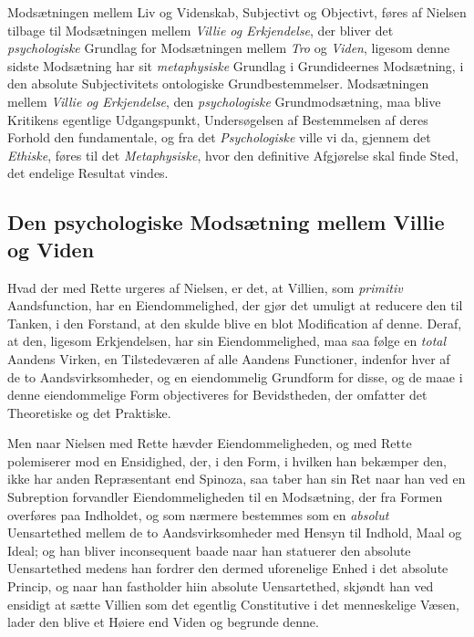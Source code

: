 \documentclass[12pt,a4paper]{book}
\newcommand{\opage}[1]{\marginnote{\footnotesize\textit{[#1]}}}
\begin{document}
Modsætningen mellem Liv og Videnskab, Subjectivt og Objectivt, føres af Nielsen tilbage til
Modsætningen mellem \emph{Villie og Erkjendelse}, der bliver det \emph{psychologiske} Grundlag for Modsætningen mellem \emph{Tro} og \emph{Viden}, ligesom denne sidste Modsætning har sit \emph{metaphysiske} Grundlag i Grundideernes Modsætning, i den absolute Subjectivitets ontologiske
Grundbestemmelser. Modsætningen mellem \emph{Villie og Erkjendelse}, den \emph{psychologiske} Grundmodsætning, maa blive Kritikens egentlige Udgangspunkt, Undersøgelsen af Bestemmelsen
af deres Forhold den fundamentale, og fra det \emph{Psychologiske} ville vi da, gjennem det \emph{Ethiske}, føres til det \emph{Metaphysiske}, hvor den definitive Afgjørelse skal finde Sted, det
endelige Resultat vindes.

\subsection{Den psychologiske Modsætning mellem Villie og Viden}
\label{ssec:psych-modsaetning}

Hvad der med Rette urgeres af Nielsen, er det, at Villien, som \emph{primitiv} Aandsfunction, har en Eiendommelighed, der gjør det umuligt at reducere
den til Tanken, i den Forstand, at den skulde blive en blot
Modification af denne. Deraf, at den, ligesom Erkjendelsen, har sin
Eiendommelighed, maa saa følge en \emph{total} Aandens Virken, en
Tilstedeværen af alle Aandens Functioner, indenfor hver af de to
Aandsvirksomheder, og en eiendommelig Grundform for disse, \opage{134}og de maae i
denne eiendommelige Form objectiveres for Bevidstheden, der omfatter det
Theoretiske og det Praktiske.

Men naar Nielsen med Rette hævder Eiendommeligheden, og med Rette
polemiserer mod en Ensidighed, der, i den Form, i hvilken han bekæmper
den, ikke har anden Repræsentant end Spinoza, saa taber han sin Ret
naar han ved en Subreption forvandler Eiendommeligheden til en
Modsætning, der fra Formen overføres paa Indholdet, og som nærmere
bestemmes som en \emph{absolut} Uensartethed mellem de to Aandsvirksomheder med Hensyn til Indhold, Maal og Ideal; og han bliver inconsequent baade
naar han statuerer den absolute Uensartethed medens han fordrer den
dermed uforenelige Enhed i det absolute Princip, og naar han fastholder
hiin absolute Uensartethed, skjøndt han ved ensidigt at sætte Villien
som det egentlig Constitutive i det menneskelige Væsen, lader den
blive et Høiere end Viden og begrunde denne.
\end{document}

